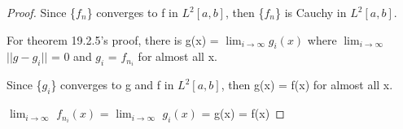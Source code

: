     \begin{proof}
        Since \{$f_n$\} converges to f in $L^2[a,b]$,
        then \{$f_n$\} is Cauchy in $L^2[a,b]$.

        For {\color{red} theorem 19.2.5}'s proof,
        there is g(x) = $\lim_{i \rightarrow \infty} g_i(x)$
        where $\lim_{i \rightarrow \infty}$ $||g-g_i||$ = 0 and
        $g_i$ = $f_{n_i}$ for almost all x.
        
        Since \{$g_i$\} converges to g and f in $L^2[a,b]$,
        then g(x) = f(x) for almost all x.

        \hspace{0.5cm}
        $\lim_{i \rightarrow \infty}$ $f_{n_i}(x)$
        = $\lim_{i \rightarrow \infty}$ $g_i(x)$
        = g(x) = f(x)
    \end{proof}














































